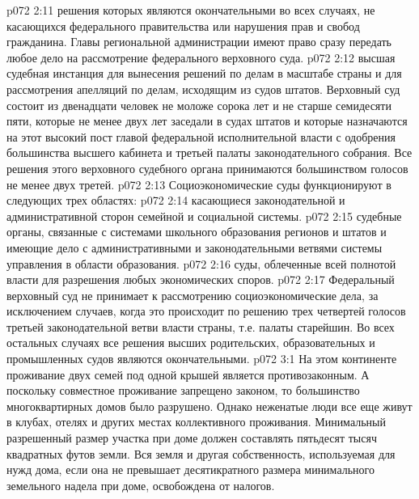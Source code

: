 \vs p072 2:11 \bibnobreakspace {} решения которых являются окончательными во всех случаях, не касающихся федерального правительства или нарушения прав и свобод гражданина. Главы региональной администрации имеют право сразу передать любое дело на рассмотрение федерального верховного суда.
\vs p072 2:12 \bibnobreakspace {} высшая судебная инстанция для вынесения решений по делам в масштабе страны и для рассмотрения апелляций по делам, исходящим из судов штатов. Верховный суд состоит из двенадцати человек не моложе сорока лет и не старше семидесяти пяти, которые не менее двух лет заседали в судах штатов и которые назначаются на этот высокий пост главой федеральной исполнительной власти с одобрения большинства высшего кабинета и третьей палаты законодательного собрания. Все решения этого верховного судебного органа принимаются большинством голосов не менее двух третей.
\vs p072 2:13 \pc Социоэкономические суды функционируют в следующих трех областях:
\vs p072 2:14 \bibnobreakspace {} касающиеся законодательной и административной сторон семейной и социальной системы.
\vs p072 2:15 \bibnobreakspace {} судебные органы, связанные с системами школьного образования регионов и штатов и имеющие дело с административными и законодательными ветвями системы управления в области образования.
\vs p072 2:16 \bibnobreakspace {} суды, облеченные всей полнотой власти для разрешения любых экономических споров.
\vs p072 2:17 \pc Федеральный верховный суд не принимает к рассмотрению социоэкономические дела, за исключением случаев, когда это происходит по решению трех четвертей голосов третьей законодательной ветви власти страны, т.е. палаты старейшин. Во всех остальных случаях все решения высших родительских, образовательных и промышленных судов являются окончательными.
\vs p072 3:1 На этом континенте проживание двух семей под одной крышей является противозаконным. А поскольку совместное проживание запрещено законом, то большинство многоквартирных домов было разрушено. Однако неженатые люди все еще живут в клубах, отелях и других местах коллективного проживания. Минимальный разрешенный размер участка при доме должен составлять пятьдесят тысяч квадратных футов земли. Вся земля и другая собственность, используемая для нужд дома, если она не превышает десятикратного размера минимального земельного надела при доме, освобождена от налогов.
